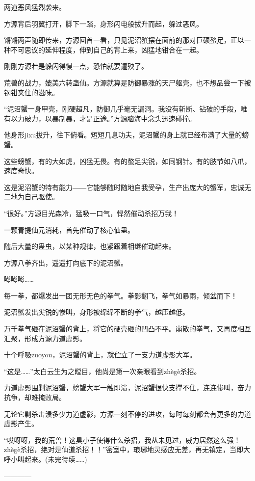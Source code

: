\begin{this_body}
两道恶风猛烈袭来。

方源背后羽翼打开，脚下一踏，身形闪电般拔升而起，躲过恶风。

锵锵两声随即传来，方源回首一看，只见泥沼蟹摆在面前的那对巨硕螯足，正以一种不可思议的延伸程度，伸到自己的背上来，凶猛地钳合在一起。

刚刚方源若是躲闪得慢一点，恐怕就要遭殃了。

荒兽的战力，媲美六转蛊仙。方源就算是防御暴涨的天尸躯壳，也不想品尝一下被钢钳夹住的滋味。

“泥沼蟹一身甲壳，刚硬超凡，防御几乎毫无漏洞。我没有斩断、钻破的手段，唯有以力破力，以暴制暴，才是正途。”方源脑海中念头迅速碰撞。

他身形jixu拔升，往下俯看。短短几息功夫，泥沼蟹的身上就已经布满了大量的螃蟹。

这些螃蟹，有的大如虎，凶猛无畏。有的螯足尖锐，如同钢针。有的肢节如八爪，速度奇快。

这是泥沼蟹的特有能力――它能够随时随地自我受孕，生产出庞大的蟹军，忠诚无二地为自己驱使。

“很好。”方源目光森冷，猛吸一口气，悍然催动杀招万我！

一颗青提仙元消耗，首先催动了核心仙蛊。

随后大量的蛊虫，以某种规律，也紧跟着相继催动起来。

方源八拳齐出，遥遥打向底下的泥沼蟹。

嘭嘭嘭……

每一拳，都爆发出一团无形无色的拳气。拳影翻飞，拳气如暴雨，倾盆而下！

泥沼蟹发出尖锐的惨叫，身形被绵绵不断的拳气，越压越低。

万千拳气砸在泥沼蟹的背上，将它的硬壳砸的凹凸不平。崩散的拳气，又再度相互汇聚，形成方源力道虚影。

十个呼吸zuoyou，泥沼蟹的背上，就伫立了一支力道虚影大军。

“这是……”太白云生为之瞠目，他尚是第一次亲眼看到zhègè杀招。

力道虚影围剿泥沼蟹，螃蟹大军一触即溃，泥沼蟹很快支撑不住，连连惨叫，奋力抗争，却难掩败局。

无论它剿杀击溃多少力道虚影，方源一刻不停的进攻，每时每刻都会有更多的力道虚影产生。

“哎呀呀，我的荒兽！这臭小子使得什么杀招，我从未见过，威力居然这么强！zhègè杀招，绝对是仙道杀招！！”密室中，琅琊地灵感应无差，再无镇定，当即大呼小叫起来。(未完待续……)

------------

\end{this_body}

